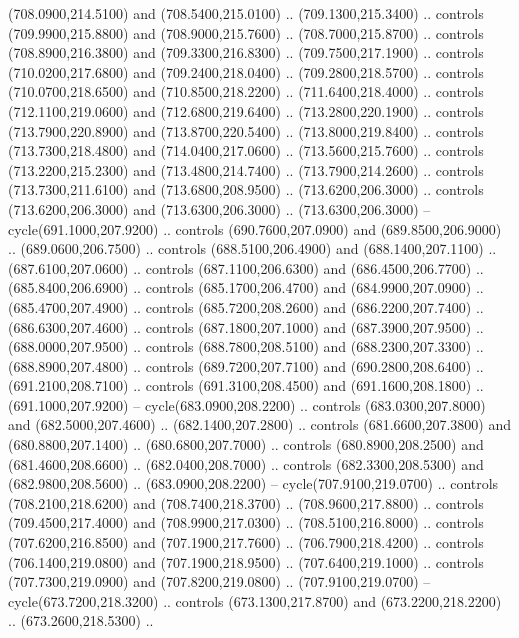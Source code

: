 {\begin{scope}[y=0.80pt, x=0.80pt, yscale=-1, xscale=1, inner sep=0pt, outer sep=0pt, #1]
      (708.0900,214.5100) and (708.5400,215.0100) .. (709.1300,215.3400) .. controls
      (709.9900,215.8800) and (708.9000,215.7600) .. (708.7000,215.8700) .. controls
      (708.8900,216.3800) and (709.3300,216.8300) .. (709.7500,217.1900) .. controls
      (710.0200,217.6800) and (709.2400,218.0400) .. (709.2800,218.5700) .. controls
      (710.0700,218.6500) and (710.8500,218.2200) .. (711.6400,218.4000) .. controls
      (712.1100,219.0600) and (712.6800,219.6400) .. (713.2800,220.1900) .. controls
      (713.7900,220.8900) and (713.8700,220.5400) .. (713.8000,219.8400) .. controls
      (713.7300,218.4800) and (714.0400,217.0600) .. (713.5600,215.7600) .. controls
      (713.2200,215.2300) and (713.4800,214.7400) .. (713.7900,214.2600) .. controls
      (713.7300,211.6100) and (713.6800,208.9500) .. (713.6200,206.3000) .. controls
      (713.6200,206.3000) and (713.6300,206.3000) .. (713.6300,206.3000) --
      cycle(691.1000,207.9200) .. controls (690.7600,207.0900) and
      (689.8500,206.9000) .. (689.0600,206.7500) .. controls (688.5100,206.4900) and
      (688.1400,207.1100) .. (687.6100,207.0600) .. controls (687.1100,206.6300) and
      (686.4500,206.7700) .. (685.8400,206.6900) .. controls (685.1700,206.4700) and
      (684.9900,207.0900) .. (685.4700,207.4900) .. controls (685.7200,208.2600) and
      (686.2200,207.7400) .. (686.6300,207.4600) .. controls (687.1800,207.1000) and
      (687.3900,207.9500) .. (688.0000,207.9500) .. controls (688.7800,208.5100) and
      (688.2300,207.3300) .. (688.8900,207.4800) .. controls (689.7200,207.7100) and
      (690.2800,208.6400) .. (691.2100,208.7100) .. controls (691.3100,208.4500) and
      (691.1600,208.1800) .. (691.1000,207.9200) -- cycle(683.0900,208.2200) ..
      controls (683.0300,207.8000) and (682.5000,207.4600) .. (682.1400,207.2800) ..
      controls (681.6600,207.3800) and (680.8800,207.1400) .. (680.6800,207.7000) ..
      controls (680.8900,208.2500) and (681.4600,208.6600) .. (682.0400,208.7000) ..
      controls (682.3300,208.5300) and (682.9800,208.5600) .. (683.0900,208.2200) --
      cycle(707.9100,219.0700) .. controls (708.2100,218.6200) and
      (708.7400,218.3700) .. (708.9600,217.8800) .. controls (709.4500,217.4000) and
      (708.9900,217.0300) .. (708.5100,216.8000) .. controls (707.6200,216.8500) and
      (707.1900,217.7600) .. (706.7900,218.4200) .. controls (706.1400,219.0800) and
      (707.1900,218.9500) .. (707.6400,219.1000) .. controls (707.7300,219.0900) and
      (707.8200,219.0800) .. (707.9100,219.0700) -- cycle(673.7200,218.3200) ..
      controls (673.1300,217.8700) and (673.2200,218.2200) .. (673.2600,218.5300) ..

\end{scope}}
